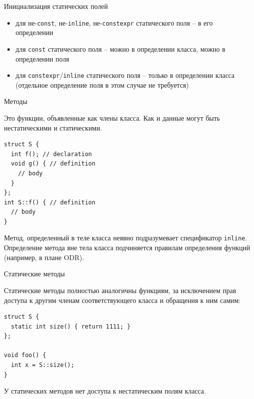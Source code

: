 \documentclass[unknownkeysallowed,xcolor=table]{beamer}
\begin{document}
\begin{frame}{Инициализация статических полей}

\begin{itemize}
  \item для не-\lstinline{const}, не-\lstinline{inline}, не-\lstinline{constexpr} статического поля -- в его определении \vspace{1em}
  \item для \lstinline{const} статического поля -- можно в определении класса, можно в определении поля \vspace{1em}
  \item для \lstinline{constexpr}/\lstinline{inline} статического поля -- только в определении класса (отдельное определение поля в этом случае не требуется)
\end{itemize}

\end{frame}

\begin{frame}[fragile]{Методы}

Это функции, объявленные как члены класса. Как и данные могут быть нестатическими и статическими.

\begin{lstlisting}
struct S {
  int f(); // declaration
  void g() { // definition
    // body
  }
};
int S::f() { // definition
  // body
}
\end{lstlisting}

Метод, определенный в теле класса неявно подразумевает спецификатор \lstinline{inline}.
Определение метода вне тела класса подчиняется правилам определения функций (например, в плане ODR).

\end{frame}

\begin{frame}[fragile]{Статические методы}

Статические методы полностью аналогичны функциям, за исключением прав доступа к другим членам соответствующего класса и обращения к ним самим:

\vspace{1em}

\begin{lstlisting}
struct S {
  static int size() { return 1111; }
};

void foo() {
  int x = S::size();
}
\end{lstlisting}

\vspace{1em}

У статических методов нет доступа к нестатическим полям класса.

\end{frame}
\end{document}
